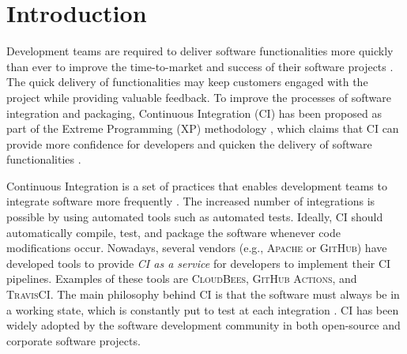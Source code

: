 \section{Introduction}

Development teams are required to deliver software functionalities more quickly than ever to
improve the time-to-market and success of their software projects \citep{Debbiche2014}. The quick delivery of functionalities may keep customers engaged with the project while providing valuable feedback. 
To improve the processes of software integration and packaging, Continuous Integration (CI) has been proposed as part of the Extreme Programming (XP) methodology \citep{Beck2000-ja}, which claims that CI can provide more confidence for developers and quicken the delivery of software functionalities \citep{Laukkanen2015-ab}. 

Continuous Integration is a set of practices that enables development teams to integrate software more frequently \citep{Fowler2006-zc}. The increased number of integrations is possible by using automated tools such as automated tests. Ideally, CI should automatically compile, test, and package the software whenever code modifications occur. Nowadays, several vendors (e.g., \textsc{Apache} or \textsc{GitHub}) have developed tools to provide {\em CI as a service} for developers to implement their CI pipelines. Examples of these tools are \textsc{CloudBees}, \textsc{GitHub Actions}, and \textsc{TravisCI}. The main philosophy behind CI is that the software must always be in a working state, which is constantly put to test at each integration \citep{Duvall2007-tb}. CI has been widely adopted by the software development community in both open-source and corporate software projects. 

